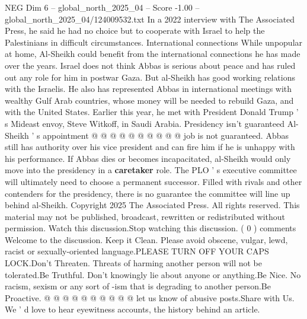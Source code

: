 \begin{textsample}{NEG Dim 6 – global\_north\_2025\_04 – Score -1.00 – global\_north\_2025\_04/124009532.txt}
In a 2022 interview with The Associated Press, he said he had no choice but to cooperate with Israel to help the Palestinians in difficult circumstances.
International connections While unpopular at home, Al-Sheikh could benefit from the international connections he has made over the years.
Israel does not think Abbas is serious about peace and has ruled out any role for him in postwar Gaza.
But al-Sheikh has good working relations with the Israelis.
He also has represented Abbas in international meetings with wealthy Gulf Arab countries, whose money will be needed to rebuild Gaza, and with the United States.
Earlier this year, he met with President Donald Trump ' s Mideast envoy, Steve Witkoff, in Saudi Arabia.
Presidency isn't guaranteed Al-Sheikh ' s appointment @ @ @ @ @ @ @ @ @ @ job is not guaranteed.
Abbas still has authority over his vice president and can fire him if he is unhappy with his performance.
If Abbas dies or becomes incapacitated, al-Sheikh would only move into the presidency in a \textbf{caretaker} role.
The PLO ' s executive committee will ultimately need to choose a permanent successor.
Filled with rivals and other contenders for the presidency, there is no guarantee the committee will line up behind al-Sheikh.
Copyright 2025 The Associated Press.
All rights reserved.
This material may not be published, broadcast, rewritten or redistributed without permission.
Watch this discussion.Stop watching this discussion. ( 0 ) comments Welcome to the discussion.
Keep it Clean.
Please avoid obscene, vulgar, lewd, racist or sexually-oriented language.PLEASE TURN OFF YOUR CAPS LOCK.Don't Threaten.
Threats of harming another person will not be tolerated.Be Truthful.
Don't knowingly lie about anyone or anything.Be Nice.
No racism, sexism or any sort of -ism that is degrading to another person.Be Proactive. @ @ @ @ @ @ @ @ @ @ let us know of abusive posts.Share with Us.
We ' d love to hear eyewitness accounts, the history behind an article.

\end{textsample}
